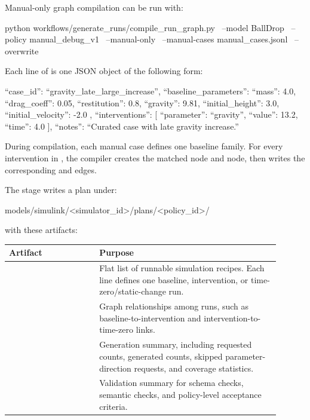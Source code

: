 \documentclass[11pt]{article}
\begin{document}
Manual-only graph compilation can be run with:

\begin{DocCode}
python workflows/generate_runs/compile_run_graph.py \
  --model BallDrop \
  --policy manual_debug_v1 \
  --manual-only \
  --manual-cases manual_cases.jsonl \
  --overwrite
\end{DocCode}

Each line of  is one JSON object of the following form:

\begin{DocCode}
{
“case_id”: “gravity_late_large_increase”,
“baseline_parameters”: {
“mass”: 4.0,
“drag_coeff”: 0.05,
“restitution”: 0.8,
“gravity”: 9.81,
“initial_height”: 3.0,
“initial_velocity”: -2.0
},
“interventions”: [
{
“parameter”: “gravity”,
“value”: 13.2,
“time”: 4.0
}
],
“notes”: “Curated case with late gravity increase.”
}
\end{DocCode}

During compilation, each manual case defines one baseline family.
For every intervention in \code{interventions}, the compiler creates the matched  node and  node, then writes the corresponding  and  edges.

The stage writes a plan under:

\begin{DocCode}
models/simulink/<simulator_id>/plans/<policy_id>/
\end{DocCode}

with these artifacts:

\begin{center}
\begin{tabular}{p{0.30\linewidth}p{0.60\linewidth}}
\hline
\textbf{Artifact} & \textbf{Purpose} \\
\hline
\code{run_nodes.jsonl} & Flat list of runnable simulation recipes. Each line defines one baseline, intervention, or time-zero/static-change run. \\
\code{run_edges.jsonl} & Graph relationships among runs, such as baseline-to-intervention and intervention-to-time-zero links. \\
\code{generation_report.json} & Generation summary, including requested counts, generated counts, skipped parameter-direction requests, and coverage statistics. \\
\code{validation_report.json} & Validation summary for schema checks, semantic checks, and policy-level acceptance criteria. \\
\hline
\end{tabular}
\end{center}
\end{document}
